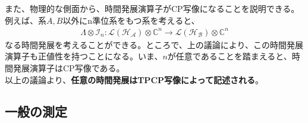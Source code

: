 \documentclass[a4paper,11pt]{jsarticle}
\numberwithin{equation}{section}
\begin{document}


また、物理的な側面から、時間発展演算子がCP写像になることを説明できる。例えば、系$A,B$以外にn準位系をもつ系を考えると、
\begin{align}
    \Lambda \otimes \mathcal{I}_n :\mathcal{L}(\mathcal{H_A}) \otimes \mathbb{C}^n \to \mathcal{L}(\mathcal{H_B}) \otimes \mathbb{C}^n
\end{align}
なる時間発展を考えることができる。ところで、上の議論により、この時間発展演算子も正値性を持つことになる。いま、$n$が任意であることを踏まえると、時間発展演算子はCP写像である。\\
以上の議論より、\textbf{任意の時間発展はTPCP写像によって記述される}。


\subsection{一般の測定}
\end{document}
